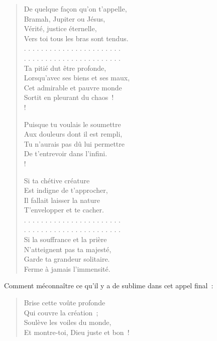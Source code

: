 \documentclass[french,twoside]{book} %
\begin{document}
\begin{verse}
De quelque façon qu’on t’appelle,\\
Bramah, Jupiter ou Jésus,\\
Vérité, justice éternelle,\\
Vers toi tous les bras sont tendus.\\
. . . . . . . . . . . . . . . . . . . . . . .\\
. . . . . . . . . . . . . . . . . . . . . . .\\
Ta pitié dut être profonde,\\
Lorsqu’avec ses biens et ses maux,\\
Cet admirable et pauvre monde\\
Sortit en pleurant du chaos !\\!

Puisque tu voulais le soumettre\\
Aux douleurs dont il est rempli,\\
Tu n’aurais pas dû lui permettre\\
De t’entrevoir dans l’infini.\\!

Si ta chétive créature\\
Est indigne de t’approcher,\\
Il fallait laisser la nature\\
T’envelopper et te cacher.\\
. . . . . . . . . . . . . . . . . . . . . . .\\
. . . . . . . . . . . . . . . . . . . . . . .\\
Si la souffrance et la prière\\
N’atteignent pas ta majesté,\\
Garde ta grandeur solitaire.\\
Ferme à jamais l’immensité.\\
\end{verse}

\noindent Comment méconnaître ce qu’il y a de sublime dans cet appel final :\par


\begin{verse}
Brise cette voûte profonde\\
Qui couvre la création ;\\
Soulève les voiles du monde,\\
Et montre-toi, Dieu juste et bon !\\
\end{verse}
\end{document}
